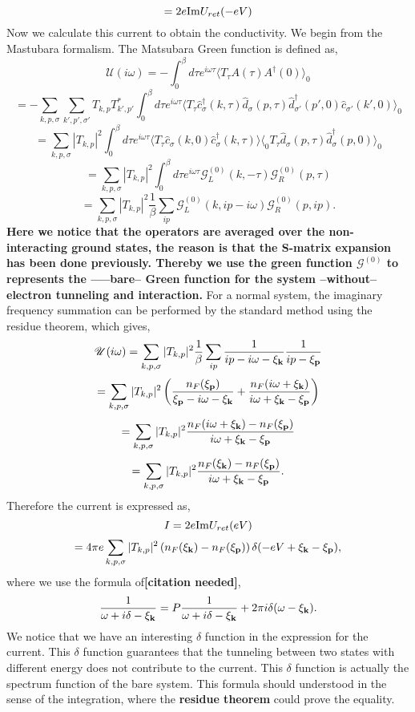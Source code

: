 \documentclass[11pt]{article}
\begin{document}
\[
= 2e {\rm Im} U_{ret} (-eV)
\] Now we calculate this current to obtain the conductivity. We begin
from the Mastubara formalism. The Matsubara Green function is defined
as, \[
\mathscr{U}(i\omega)  = - \int_0^\beta d\tau  e^{i\omega \tau}   \langle T_\tau A(\tau) A^\dagger(0) \rangle_0
\] \[
=- \sum_{k,p,\sigma} \sum_{k',p',\sigma'} T_{k,p} T^*_{k',p'}  \int_0^\beta d\tau  e^{i\omega \tau}  \langle T_\tau \hat c^\dagger_\sigma(k,\tau) \hat d_\sigma(p,\tau) \hat d^\dagger_{\sigma'}(p',0) \hat c_{\sigma'}(k',0) \rangle_0
\] \[
= \sum_{k,p,\sigma}  |T_{k,p}|^2 \int_0^\beta d\tau  e^{i\omega \tau}  \langle T_\tau \hat c_{\sigma}(k,0)  \hat c^\dagger_\sigma(k,\tau) \rangle \langle_0 T_\tau  \hat d_\sigma(p,\tau) \hat d^\dagger_{\sigma}(p,0)  \rangle_0
\] \[
=\sum_{k,p,\sigma}  |T_{k,p}|^2 \int_0^\beta d\tau  e^{i\omega \tau}   \mathscr{G}^{(0)}_L(k,-\tau)  \mathscr{G}^{(0)}_R(p,\tau)
\] \[
=\sum_{k,p,\sigma}  |T_{k,p}|^2 \frac{1}{\beta } \sum_{ip}  \mathscr{G}^{(0)}_L(k,ip-i\omega)  \mathscr{G}^{(0)}_R(p,ip).
\] \textbf{Here we notice that the operators are averaged over the
non-interacting ground states, the reason is that the S-matrix expansion
has been done previously. Thereby we use the green function
\(\mathscr{G}^{(0)}\) to represents the -----bare-- Green function for
the system --without-- electron tunneling and interaction.} For a normal
system, the imaginary frequency summation can be performed by the
standard method using the residue theorem, which gives, \[
\mathscr{U}(i\omega) = \sum_{k,p,\sigma}  |T_{k,p}|^2 \frac{1}{\beta } \sum_{ip} \frac{1}{ip-i\omega-\xi_{\bf k}} \frac{1}{ip-\xi_{\bf p}}
\] \[
= \sum_{k,p,\sigma}  |T_{k,p}|^2  \left(\frac{n_F(\xi_{\bf p})}{\xi_{\bf p} -i\omega -\xi_{\bf k}} + \frac{n_F(i\omega+\xi_{\bf k})}{i\omega+\xi_{\bf k} -\xi_{\bf p}}\right)
\] \[
=  \sum_{k,p,\sigma}  |T_{k,p}|^2  \frac{n_F(i\omega+\xi_{\bf k})- n_F(\xi_{\bf p})}{i\omega+\xi_{\bf k} -\xi_{\bf p}}
\] \[
=  \sum_{k,p,\sigma}  |T_{k,p}|^2  \frac{n_F(\xi_{\bf k})- n_F(\xi_{\bf p})}{i\omega+\xi_{\bf k} -\xi_{\bf p}}.
\] Therefore the current is expressed as, \[
I  = 2e {\rm Im} U_{ret} (eV) 
\] \[
= 4 \pi e  \sum_{k,p,\sigma}  |T_{k,p}|^2  \left( n_F(\xi_{\bf k})- n_F(\xi_{\bf p}) \right)  \delta(-eV   +\xi_{\bf k} -\xi_{\bf p}),
\] where we use the formula of\textbf{{[}citation needed{]}}, \[
\frac{1}{\omega + i \delta - \xi_{\bf k}} = P\frac{1}{\omega + i \delta - \xi_{\bf k}} + 2\pi i   \delta (\omega - \xi_{\bf k}).
\] We notice that we have an interesting \(\delta\) function in the
expression for the current. This \(\delta\) function guarantees that the
tunneling between two states with different energy does not contribute
to the current. This \(\delta\) function is actually the spectrum
function of the bare system. This formula should understood in the sense
of the integration, where the \textbf{residue theorem} could prove the
equality.
\end{document}
